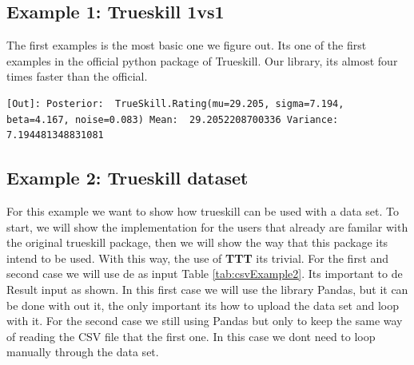 \documentclass[article]{jss}
\begin{document}
\subsection{Example 1: Trueskill 1vs1}
The first examples is the most basic one we figure out. Its one of the first examples in the official python package of Trueskill. Our library, its almost four times faster than the official.


\begin{lstlisting}
[Out]: Posterior:  TrueSkill.Rating(mu=29.205, sigma=7.194, beta=4.167, noise=0.083) Mean:  29.2052208700336 Variance:  7.194481348831081
\end{lstlisting}
\subsection{Example 2: Trueskill dataset}
For this example  we want to show how trueskill can be used with a data set. To start, we will show the implementation for the users that already are familar with the original trueskill package, then we will show the way that this package its intend to be used. With this way, the use of \textbf{TTT} its trivial. For the first and second case we will use de as input Table \ref{tab:csvExample2}. Its important to de Result input as shown. In this first case we will use the library Pandas, but it can be done with out it, the only important its how to upload the data set and loop with it. For the second case we still using Pandas but only to keep the same way of reading the CSV file that the first one. In this case we dont need to loop manually through the data set.
\end{document}
